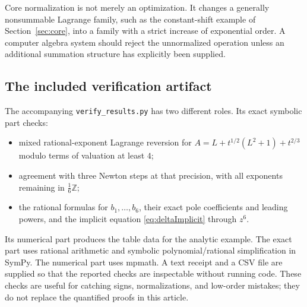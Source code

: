 \documentclass[11pt,a4paper]{article}
\theoremstyle{definition}
\theoremstyle{remark}
\newcommand{\Z}{\mathbb Z}
\begin{document}
Core normalization is not merely an optimization. It changes a generally
nonsummable Lagrange family, such as the constant-shift example of
Section~\ref{sec:core}, into a family with a strict increase of exponential
order. A computer algebra system should reject the unnormalized operation
unless an additional summation structure has explicitly been supplied.

\subsection{The included verification artifact}
The accompanying \texttt{verify\_results.py} has two different roles.
Its exact symbolic part checks:
\begin{itemize}
 \item mixed rational-exponent Lagrange reversion for
 $A=L+t^{1/2}(L^2+1)+t^{2/3}$ modulo terms of valuation at least $4$;
 \item agreement with three Newton steps at that precision, with all
 exponents remaining in $\tfrac16\Z$;
 \item the rational formulas for $b_1,\ldots,b_6$, their exact pole
 coefficients and leading powers, and the implicit equation
 \eqref{eq:deltaImplicit} through $z^6$.
\end{itemize}
Its numerical part produces the table data for the analytic example.
The exact part uses rational arithmetic and symbolic polynomial/rational
simplification in SymPy. The numerical part uses mpmath. A text receipt
and a CSV file are supplied so that the reported checks are inspectable
without running code. These checks are useful for catching signs,
normalizations, and low-order mistakes; they do not replace the quantified
proofs in this article.
\end{document}
